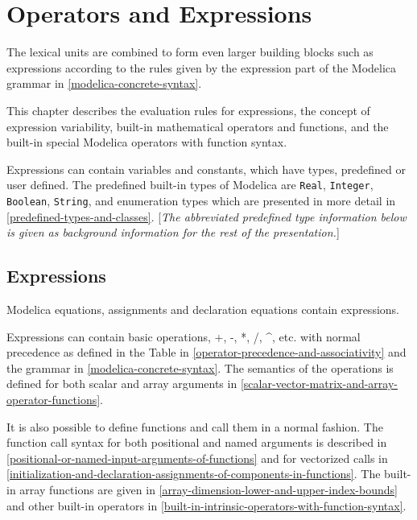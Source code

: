 \chapter{Operators and Expressions}

The lexical units are combined to form even larger building blocks such
as expressions according to the rules given by the expression part of
the Modelica grammar in \autoref{modelica-concrete-syntax}.

This chapter describes the evaluation rules for expressions, the concept
of expression variability, built-in mathematical operators and
functions, and the built-in special Modelica operators with function
syntax.

Expressions can contain variables and constants, which have types,
predefined or user defined. The predefined built-in types of Modelica
are \lstinline[basicstyle=\ttfamily]!Real!, \lstinline[basicstyle=\ttfamily]!Integer!, \lstinline[basicstyle=\ttfamily]!Boolean!, \lstinline[basicstyle=\ttfamily]!String!, and enumeration types which are
presented in more detail in \autoref{predefined-types-and-classes}. {[}\emph{The abbreviated
predefined type information below is given as background information for
the rest of the presentation.}{]}

\section{Expressions}

Modelica equations, assignments and declaration equations contain
expressions.

Expressions can contain basic operations, +, -, *, /, \^{}, etc. with
normal precedence as defined in the Table in \autoref{operator-precedence-and-associativity} and the grammar
in \autoref{modelica-concrete-syntax}. The semantics of the operations is defined for both
scalar and array arguments in \autoref{scalar-vector-matrix-and-array-operator-functions}.

It is also possible to define functions and call them in a normal
fashion. The function call syntax for both positional and named
arguments is described in \autoref{positional-or-named-input-arguments-of-functions} and for vectorized calls in
\autoref{initialization-and-declaration-assignments-of-components-in-functions}. The built-in array functions are given in \autoref{array-dimension-lower-and-upper-index-bounds}
and other built-in operators in \autoref{built-in-intrinsic-operators-with-function-syntax}.


